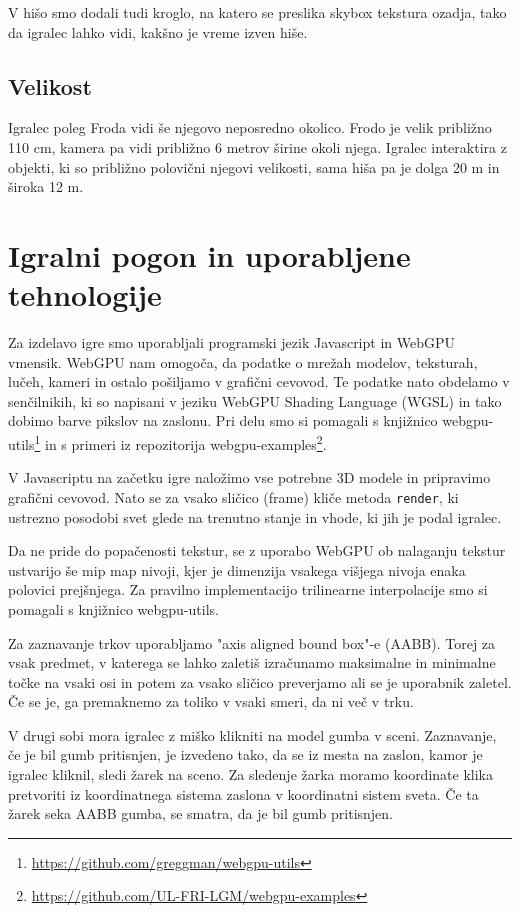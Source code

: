 \documentclass[a4paper,12pt]{article}
\begin{document}
V hišo smo dodali tudi kroglo, na katero se preslika skybox tekstura ozadja, tako da igralec lahko vidi, kakšno je vreme izven hiše.

\subsection{Velikost}
Igralec poleg Froda vidi še njegovo neposredno okolico. Frodo je velik približno 110 cm, kamera pa vidi približno 6 metrov širine okoli njega. Igralec interaktira z objekti, ki so približno polovični njegovi velikosti, sama hiša pa je dolga 20 m in široka 12 m.


\section{Igralni pogon in uporabljene tehnologije}
Za izdelavo igre smo uporabljali programski jezik Javascript in WebGPU vmensik. WebGPU nam omogoča, da podatke o mrežah modelov, teksturah, lučeh, kameri in ostalo pošiljamo v grafični cevovod. Te podatke nato obdelamo v senčilnikih, ki so napisani v jeziku WebGPU Shading Language (WGSL) in tako dobimo barve pikslov na zaslonu. Pri delu smo si pomagali s knjižnico webgpu-utils\footnote{\url{https://github.com/greggman/webgpu-utils}} in s primeri iz repozitorija webgpu-examples\footnote{\url{https://github.com/UL-FRI-LGM/webgpu-examples}}.

V Javascriptu na začetku igre naložimo vse potrebne 3D modele in pripravimo grafični cevovod. Nato se za vsako sličico (frame) kliče metoda \verb+render+, ki ustrezno posodobi svet glede na trenutno stanje in vhode, ki jih je podal igralec.

Da ne pride do popačenosti tekstur, se z uporabo WebGPU ob nalaganju tekstur ustvarijo še mip map nivoji, kjer je dimenzija vsakega višjega nivoja enaka polovici prejšnjega. Za pravilno implementacijo trilinearne interpolacije smo si pomagali s knjižnico webgpu-utils.

Za zaznavanje trkov uporabljamo "axis aligned bound box"-e (AABB). Torej za vsak predmet, v katerega se lahko zaletiš izračunamo maksimalne in minimalne točke na vsaki osi in potem za vsako sličico preverjamo ali se je uporabnik zaletel. Če se je, ga premaknemo za toliko v vsaki smeri, da ni več v trku.

V drugi sobi mora igralec z miško klikniti na model gumba v sceni. Zaznavanje, če je bil gumb pritisnjen, je izvedeno tako, da se iz mesta na zaslon, kamor je igralec kliknil, sledi žarek na sceno. Za sledenje žarka moramo koordinate klika pretvoriti iz koordinatnega sistema zaslona v koordinatni sistem sveta. Če ta žarek seka AABB gumba, se smatra, da je bil gumb pritisnjen.
\end{document}
